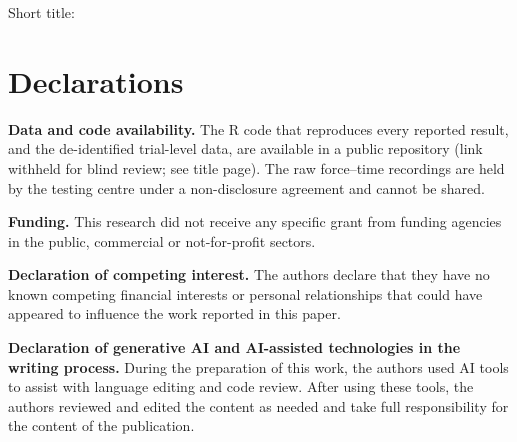 \documentclass[12pt,a4paper]{article}
\begin{document}
\begin{onehalfspacing}
\begin{center}
{\Large\bfseries \papertitle\par}
\medskip
{\normalsize Short title: \shorttitle\par}
\end{center}
\medskip
\par
\bigskip
\par
\end{onehalfspacing}
\clearpage
\doublespacing
\linenumbers

\nolinenumbers

\section*{Declarations}
\begin{onehalfspacing}
\noindent\textbf{Data and code availability.} The R code that reproduces every reported result, and the de-identified trial-level data, are available in a public repository (link withheld for blind review; see title page). The raw force--time recordings are held by the testing centre under a non-disclosure agreement and cannot be shared.

\medskip
\noindent\textbf{Funding.} This research did not receive any specific grant from funding agencies in the public, commercial or not-for-profit sectors.

\medskip
\noindent\textbf{Declaration of competing interest.} The authors declare that they have no known competing financial interests or personal relationships that could have appeared to influence the work reported in this paper.

\medskip
\noindent\textbf{Declaration of generative AI and AI-assisted technologies in the writing process.} During the preparation of this work, the authors used AI tools to assist with language editing and code review. After using these tools, the authors reviewed and edited the content as needed and take full responsibility for the content of the publication.
\end{onehalfspacing}

\singlespacing
\printbibliography
\end{document}
